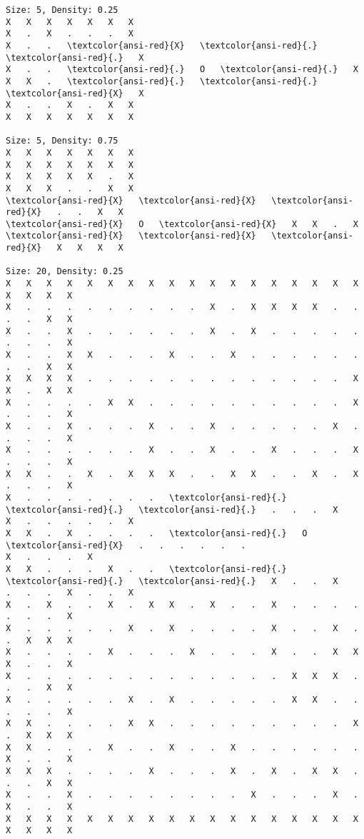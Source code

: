 \documentclass[11pt]{article}
\begin{document}
    \begin{Verbatim}[commandchars=\\\{\},fontsize=\footnotesize]
Size: 5, Density: 0.25
X   X   X   X   X   X   X
X   .   X   .   .   .   X
X   .   .   \textcolor{ansi-red}{X}   \textcolor{ansi-red}{.}   \textcolor{ansi-red}{.}   X
X   .   .   \textcolor{ansi-red}{.}   O   \textcolor{ansi-red}{.}   X
X   X   .   \textcolor{ansi-red}{.}   \textcolor{ansi-red}{.}   \textcolor{ansi-red}{X}   X
X   .   .   X   .   X   X
X   X   X   X   X   X   X

Size: 5, Density: 0.75
X   X   X   X   X   X   X
X   X   X   X   X   X   X
X   X   X   X   X   .   X
X   X   X   .   .   X   X
\textcolor{ansi-red}{X}   \textcolor{ansi-red}{X}   \textcolor{ansi-red}{X}   .   .   X   X
\textcolor{ansi-red}{X}   O   \textcolor{ansi-red}{X}   X   X   .   X
\textcolor{ansi-red}{X}   \textcolor{ansi-red}{X}   \textcolor{ansi-red}{X}   X   X   X   X

Size: 20, Density: 0.25
X   X   X   X   X   X   X   X   X   X   X   X   X   X   X   X   X   X   X   X   X   X
X   .   .   .   .   .   .   .   .   .   X   .   X   X   X   X   .   .   .   .   X   X
X   .   .   X   .   .   .   .   .   .   X   .   X   .   .   .   .   .   .   .   .   X
X   .   .   X   X   .   .   .   X   .   .   X   .   .   .   .   .   .   .   .   X   X
X   X   X   X   .   .   .   .   .   .   .   .   .   .   .   .   .   X   X   .   X   X
X   .   .   .   .   X   X   .   .   .   .   .   .   .   .   .   .   X   .   .   .   X
X   .   .   X   .   .   .   X   .   .   X   .   .   .   .   .   X   .   .   .   .   X
X   .   .   .   .   .   .   X   .   .   X   .   .   X   .   .   .   X   .   .   .   X
X   X   .   .   X   .   X   X   X   .   .   X   X   .   .   X   .   X   .   .   .   X
X   .   .   .   .   .   .   .   \textcolor{ansi-red}{.}   \textcolor{ansi-red}{.}   \textcolor{ansi-red}{.}   .   .   .   X
X   .   .   .   .   .   X
X   X   .   X   .   .   .   .   \textcolor{ansi-red}{.}   O   \textcolor{ansi-red}{X}   .   .   .   .   .   .
X   .   .   .   X
X   X   .   .   .   X   .   .   \textcolor{ansi-red}{.}   \textcolor{ansi-red}{.}   \textcolor{ansi-red}{.}   X   .   .   X
.   .   .   X   .   .   X
X   .   X   .   .   X   .   X   X   .   X   .   .   X   .   .   .   .   .   .   .   X
X   .   .   .   .   .   X   .   X   .   .   .   .   X   .   .   X   .   .   X   X   X
X   .   .   .   .   X   .   .   .   X   .   .   .   X   .   .   X   X   X   .   .   X
X   .   .   .   .   .   .   .   .   .   .   .   .   .   X   X   X   .   .   .   X   X
X   .   .   .   .   .   X   .   X   .   .   .   .   .   X   X   .   .   .   .   .   X
X   X   .   .   .   .   X   X   .   .   .   .   .   .   .   .   .   X   .   X   X   X
X   X   .   .   .   X   .   .   X   .   .   X   .   .   .   .   .   .   X   .   .   X
X   X   X   .   .   .   .   X   .   .   .   X   .   X   .   X   X   .   .   .   X   X
X   .   .   X   .   .   .   .   .   .   .   .   X   .   .   .   X   .   X   .   .   X
X   X   X   X   X   X   X   X   X   X   X   X   X   X   X   X   X   X   X   X   X   X


\end{Verbatim}
\end{document}
